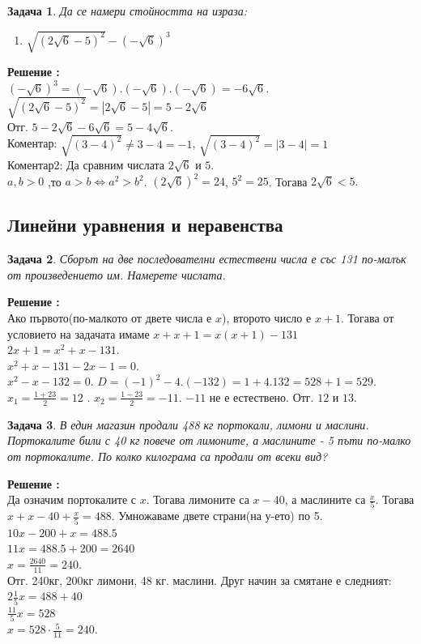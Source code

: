 \documentclass{article}
\newtheorem{problem}{Задача}
\newcounter{solution}
\newcommand\solution{%
	\stepcounter{solution}%
	\textbf{Решение :}\\%
}
\begin{document}
\begin{problem}
Да се намери стойността на израза:
\begin{enumerate}
	\item $\sqrt{(2\sqrt{6} - 5 )^2} - (-\sqrt{6})^3$
\end{enumerate}	
\end{problem}
\solution

$ (-\sqrt{6})^3 =(-\sqrt{6}).(-\sqrt{6}).(-\sqrt{6}) = -6\sqrt{6}. $ \\
$\sqrt{(2\sqrt{6} - 5 )^2} = | 2\sqrt{6} - 5 | = 5 - 2\sqrt6$ \\
Отг. $ 5 - 2\sqrt 6 - 6\sqrt{6} = 5 - 4\sqrt{6} $. \\
Коментар: $\sqrt{(3-4)^2} \neq 3-4 = -1 $, $\sqrt{(3-4)^2} = | 3-4| = 1$  \\
Коментар2: Да сравним числата $2\sqrt6$ и $5.$ \\
$a,b >0 $ ,то $a>b \iff a^2 > b^2 $. 
$(2\sqrt 6)^2 = 24$, $5^2 = 25 $. Тогава  $2\sqrt6 < 5.$

\subsection{Линейни уравнения и неравенства}

\begin{problem}
	Сборът на две последователни естествени числа е със 131 по-малък от произведението им. Намерете числата.	
\end{problem}
\solution
 Ако първото(по-малкото от двете числа е $x$), второто число е $x+1$. Тогава от условието на задачата имаме 
 $ x + x+1 = x(x+1) - 131 $ \\ $2x + 1 = x^2 + x - 131.$ \\
 $x^2 + x - 131  -2x -1 = 0.$ \\
 $ x^2 -x -132 = 0.$
$D = (-1)^2 - 4.(-132) = 1 + 4.132 = 528+1 =529.$
$x_1 = \frac{1 +23}{2} = 12 $ . $x_2 = \frac{1 - 23}{2} = -11$. $-11$ не е естествено.
Отг. $12$ и $13$.

\begin{problem}
	В един магазин продали 488 кг портокали, лимони и маслини. Портокалите били с 40 кг повече от лимоните, а маслините - 5 пъти по-малко от портокалите. По колко килограма са продали от всеки вид?
\end{problem}
\solution Да означим портокалите с $x$. Тогава лимоните са $x-40 $, а маслините са $\frac{x}{5} $. Тогава $x + x - 40 + \frac{x}{5} = 488.$ Умножаваме двете страни(на у-ето) по 5. \\ $10x - 200 + x = 488.5 $ \\
$11x  = 488.5 + 200 = 2640 $ \\
$x = \frac{2640}{11} = 240 $. \\
Отг. 240кг, 200кг лимони, 48 кг. маслини.
Друг начин за смятане е следният:
$2\frac{1}{5}x = 488 + 40 $ \\
$ \frac{11}{5}x = 528 $ \\
$ x = 528 \cdot \frac{5}{11} = 240.$
\end{document}
